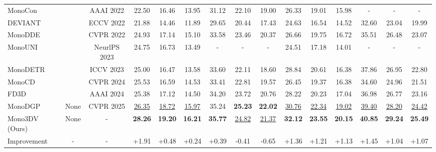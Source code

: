 \begin{table}[h!]
{\begin{tabular}{l|c|c|clcc|ccc|clcc|clcc}
MonoCon~\cite{MonoCon} &  & AAAI 2022 & \multicolumn{2}{c}{22.50} & 16.46 & 13.95 & 31.12 & 22.10 & 19.00 & \multicolumn{2}{c}{26.33} & 19.01 & 15.98 & \multicolumn{2}{c}{-} & - & - \\
DEVIANT~\cite{DEVIANT} &  & ECCV 2022 & \multicolumn{2}{c}{21.88} & 14.46 & 11.89 & 29.65 & 20.44 & 17.43 & \multicolumn{2}{c}{24.63} & 16.54 & 14.52 & \multicolumn{2}{c}{32.60} & 23.04 & 19.99 \\
MonoDDE~\cite{MonoDDE} &  & CVPR 2022 & \multicolumn{2}{c}{24.93} & 17.14 & 15.10 & 33.58 & 23.46 & 20.37 & \multicolumn{2}{c}{26.66} & 19.75 & 16.72 & \multicolumn{2}{c}{35.51} & 26.48 & 23.07 \\
MonoUNI~\cite{MonoUNI} &  & NeurlPS 2023 & \multicolumn{2}{c}{24.75} & 16.73 & 13.49 & - & - & - & \multicolumn{2}{c}{24.51} & 17.18 & 14.01 & \multicolumn{2}{c}{-} & - & - \\
MonoDETR~\cite{MonoDETR} &  & ICCV 2023 & \multicolumn{2}{c}{25.00} & 16.47 & 13.58 & 33.60 & 22.11 & 18.60 & \multicolumn{2}{c}{28.84} & 20.61 & 16.38 & \multicolumn{2}{c}{37.86} & 26.95 & 22.80 \\
MonoCD~\cite{MonoCD} &  & CVPR 2024 & \multicolumn{2}{c}{25.53} & 16.59 & 14.53 & 33.41 & 22.81 & 19.57 & \multicolumn{2}{c}{26.45} & 19.37 & 16.38 & \multicolumn{2}{c}{34.60} & 24.96 & 21.51 \\
FD3D~\cite{FD3D} & & AAAI 2024 & \multicolumn{2}{c}{25.38} & 17.12 & 14.50 & 34.20 & 23.72 & 20.76 & \multicolumn{2}{c}{28.22} & 20.23 & 17.04 & \multicolumn{2}{c}{36.98} & 26.77 & 23.16 \\
MonoDGP~\cite{MonoDGP} & \multirow{-8}{*}{None} & CVPR 2025 & \multicolumn{2}{c}{\underline{26.35}} & \underline{18.72} & \underline{15.97} & 35.24 & \textbf{25.23} & \textbf{22.02} & \multicolumn{2}{c}{\underline{30.76}} & \underline{22.34} & \underline{19.02} & \multicolumn{2}{c}{\underline{39.40}} & \underline{28.20} & \underline{24.42} \\ \hline
Mono3DV (Ours) & None & - & \multicolumn{2}{c}{\textbf{28.26}} & \textbf{19.20} & \textbf{16.21} & \textbf{35.77} & \underline{24.82} & \underline{21.37} & \multicolumn{2}{c}{\textbf{32.12}} & \textbf{23.55} & \textbf{20.15} & \multicolumn{2}{c}{\textbf{40.85}} & \textbf{29.24} & \textbf{25.49} \\
Improvement & - & - & \multicolumn{2}{c}{{\color[HTML]{3166FF} +1.91}} & {\color[HTML]{3166FF} +0.48} & {\color[HTML]{3166FF} +0.24} & {\color[HTML]{3166FF} +0.39} & {\color[HTML]{FE0000} -0.41} & {\color[HTML]{FE0000} -0.65} & \multicolumn{2}{c}{{\color[HTML]{3166FF} +1.36}} & {\color[HTML]{3166FF} +1.21} & {\color[HTML]{3166FF} +1.13} & \multicolumn{2}{c}{{\color[HTML]{3166FF} +1.45}} & {\color[HTML]{3166FF} +1.04} & {\color[HTML]{3166FF} +1.07} \\ \hline
\end{tabular}}
\label{tab:mono3dv_main_result}
\end{table}

